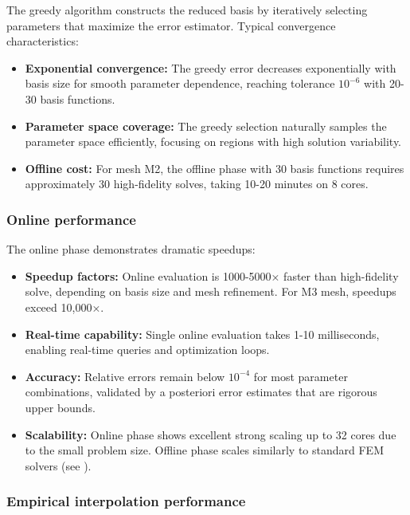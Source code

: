 The greedy algorithm constructs the reduced basis by iteratively selecting parameters that maximize the error estimator. Typical convergence characteristics:

\begin{itemize}
\item \textbf{Exponential convergence:} The greedy error decreases exponentially with basis size for smooth parameter dependence, reaching tolerance $10^{-6}$ with 20-30 basis functions.

\item \textbf{Parameter space coverage:} The greedy selection naturally samples the parameter space efficiently, focusing on regions with high solution variability.

\item \textbf{Offline cost:} For mesh M2, the offline phase with 30 basis functions requires approximately 30 high-fidelity solves, taking 10-20 minutes on 8 cores.
\end{itemize}

\subsubsection{Online performance}

The online phase demonstrates dramatic speedups:

\begin{itemize}
\item \textbf{Speedup factors:} Online evaluation is 1000-5000× faster than high-fidelity solve, depending on basis size and mesh refinement. For M3 mesh, speedups exceed 10,000×.

\item \textbf{Real-time capability:} Single online evaluation takes 1-10 milliseconds, enabling real-time queries and optimization loops.

\item \textbf{Accuracy:} Relative errors remain below $10^{-4}$ for most parameter combinations, validated by a posteriori error estimates that are rigorous upper bounds.

\item \textbf{Scalability:} Online phase shows excellent strong scaling up to 32 cores due to the small problem size. Offline phase scales similarly to standard FEM solvers (see ).
\end{itemize}

\subsubsection{Empirical interpolation performance}

